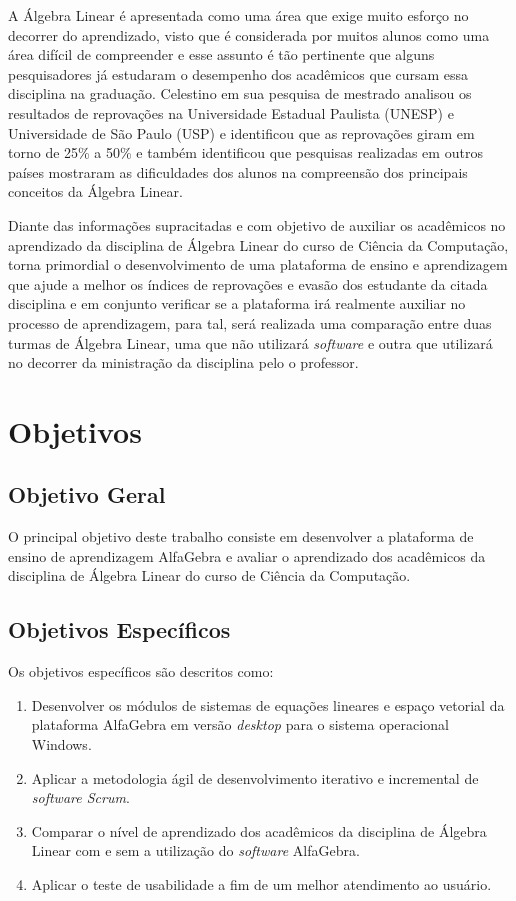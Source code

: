A Álgebra Linear é apresentada como uma área que exige muito esforço no decorrer do aprendizado, visto que é considerada por muitos alunos como uma área difícil de compreender e esse assunto é tão pertinente que alguns pesquisadores já estudaram o desempenho dos acadêmicos que cursam essa disciplina na graduação. Celestino \cite{2000:celestino} em sua pesquisa de mestrado analisou os resultados de reprovações na Universidade Estadual Paulista (UNESP) e Universidade de São Paulo (USP) e identificou que as reprovações giram em torno de 25\% a 50\% e também identificou que pesquisas realizadas em outros países mostraram as dificuldades dos alunos na compreensão dos principais conceitos da Álgebra Linear.

Diante das informações supracitadas e com objetivo de auxiliar os acadêmicos no aprendizado da disciplina de Álgebra Linear do curso de Ciência da Computação, torna primordial o desenvolvimento de uma plataforma de ensino e aprendizagem que ajude a melhor os índices de reprovações e evasão dos estudante da citada disciplina e em conjunto verificar se a plataforma irá realmente auxiliar no processo de aprendizagem, para tal, será realizada uma comparação entre duas turmas de Álgebra Linear, uma que não utilizará \textit{software} e outra que utilizará no decorrer da ministração da disciplina pelo o professor.  

\section{Objetivos}

\subsection{Objetivo Geral}

\noindent O principal objetivo deste trabalho consiste em desenvolver a plataforma de ensino de aprendizagem AlfaGebra e avaliar o aprendizado dos acadêmicos da disciplina de Álgebra Linear do curso de Ciência da Computação.

\subsection{Objetivos Específicos}

Os objetivos específicos são descritos como:

\begin{enumerate}
    \item Desenvolver os módulos de sistemas de equações lineares e espaço vetorial da plataforma AlfaGebra em versão \textit{desktop} para o sistema operacional Windows.
	
	\item Aplicar a metodologia ágil de desenvolvimento iterativo e incremental de \textit{software Scrum}.
	
	\item Comparar o nível de aprendizado dos acadêmicos da disciplina de Álgebra Linear com e sem a utilização do \textit{software} AlfaGebra.
	
	\item Aplicar o teste de usabilidade a fim de um melhor atendimento ao usuário.
\end{enumerate}


